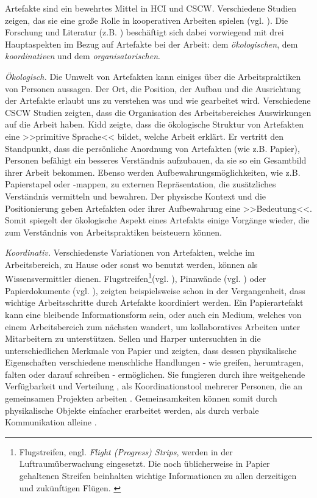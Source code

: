 \medskip Artefakte sind ein bewehrtes Mittel in HCI und CSCW. Verschiedene Studien zeigen, das sie eine große Rolle in kooperativen Arbeiten spielen (vgl. \citealp{Bardram:2005, Heath:1992, Hutchins:1995, Robinson:1993, Schmidt:2002, Sellen:2003, Shapiro:1994, Vyas:2008}). Die Forschung und Literatur (z.B. \citealp{Randall:2007}) beschäftigt sich dabei vorwiegend mit drei Hauptaspekten im Bezug auf Artefakte bei der Arbeit: dem \emph{ökologischen}, dem \emph{koordinativen} und dem \emph{organisatorischen}.

\medskip \emph{Ökologisch.} Die Umwelt von Artefakten kann einiges über die Arbeitspraktiken von Personen aussagen. Der Ort, die Position, der Aufbau und die Ausrichtung der Artefakte erlaubt uns zu verstehen was und wie gearbeitet wird. Verschiedene CSCW Studien \citep{Heath:1992, Sellen:2003} zeigten, dass die Organisation des Arbeitsbereiches Auswirkungen auf die Arbeit haben. Kidd \citep{Kidd:1994} zeigte, dass die ökologische Struktur von Artefakten eine >>primitive Sprache<< bildet, welche Arbeit erklärt. Er vertritt den Standpunkt, dass die persönliche Anordnung von Artefakten (wie z.B. Papier), Personen befähigt ein besseres Verständnis aufzubauen, da sie so ein Gesamtbild ihrer Arbeit bekommen. Ebenso werden Aufbewahrungsmöglichkeiten, wie z.B. Papierstapel oder -mappen, zu externen Repräsentation, die zusätzliches Verständnis vermitteln und bewahren. Der physische Kontext und die Positionierung geben Artefakten oder ihrer Aufbewahrung eine >>Bedeutung<<. Somit spiegelt der ökologische Aspekt eines Artefakts einige Vorgänge wieder, die zum Verständnis von Arbeitspraktiken beisteuern können.

\medskip \emph{Koordinativ.} Verschiedenste Variationen von Artefakten, welche im Arbeitsbereich, zu Hause oder sonst wo benutzt werden, können als Wissensvermittler dienen. Flugstreifen\footnote{Flugstreifen, engl. \emph{Flight (Progress) Strips}, werden in der Luftraumüberwachung eingesetzt. Die noch üblicherweise in Papier gehaltenen Streifen beinhalten wichtige Informationen zu allen derzeitigen und zukünftigen Flügen. \citep{Bentley:1992}}(vgl. \citealp{Shapiro:1994}), Pinnwände (vgl. \citealp{Bardram:2005}) oder Papierdokumente (vgl. \citealp{Sellen:2003}), zeigten beispielsweise schon in der Vergangenheit, dass wichtige Arbeitsschritte durch Artefakte koordiniert werden. Ein Papierartefakt kann eine bleibende Informationsform sein, oder auch ein Medium, welches von einem Arbeitsbereich zum nächsten wandert, um kollaboratives Arbeiten unter Mitarbeitern zu unterstützen. Sellen und Harper untersuchten in \citep{Sellen:2003} die unterschiedlichen Merkmale von Papier und zeigten, dass dessen physikalische Eigenschaften verschiedene menschliche Handlungen - wie greifen, herumtragen, falten oder darauf schreiben - ermöglichen. Sie fungieren durch ihre weitgehende Verfügbarkeit \citep{Heath:1992} und Verteilung \citep{Robinson:1993}, als Koordinationstool mehrerer Personen, die an gemeinsamen Projekten arbeiten \citep{Vyas:2008}. Gemeinsamkeiten können somit durch physikalische Objekte einfacher erarbeitet werden, als durch verbale Kommunikation alleine \citep{Larsson:2003}.

